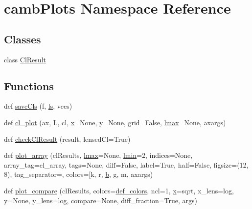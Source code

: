 \hypertarget{namespacecambPlots}{}\section{camb\+Plots Namespace Reference}
\label{namespacecambPlots}
\subsection*{Classes}
\begin{DoxyCompactItemize}
\item 
class \mbox{\hyperlink{classcambPlots_1_1ClResult}{Cl\+Result}}
\end{DoxyCompactItemize}
\subsection*{Functions}
\begin{DoxyCompactItemize}
\item 
def \mbox{\hyperlink{namespacecambPlots_ab98294b0b14bbdbda8be11a187411746}{save\+Cls}} (f, \mbox{\hyperlink{plotTT_8m_aac1113e50f7f1460beeaeeba69f63701}{ls}}, vecs)
\item 
def \mbox{\hyperlink{namespacecambPlots_acbf66894e403d2b8926fa5a598fb204d}{cl\+\_\+plot}} (ax, L, cl, \mbox{\hyperlink{plotTT_8m_a9336ebf25087d91c818ee6e9ec29f8c1}{x}}=None, y=None, grid=False, \mbox{\hyperlink{plotTT_8m_aa9755a1150619f3bbad65080cf613ef8}{lmax}}=None, axargs)
\item 
def \mbox{\hyperlink{namespacecambPlots_a92f653f492e72e931e693f9e0e0a4c6a}{check\+Cl\+Result}} (result, lensed\+Cl=True)
\item 
def \mbox{\hyperlink{namespacecambPlots_a0929c1777ebbcf7b4f020b63ec6ce36f}{plot\+\_\+array}} (cl\+Results, \mbox{\hyperlink{plotTT_8m_aa9755a1150619f3bbad65080cf613ef8}{lmax}}=None, \mbox{\hyperlink{plotTT_8m_aef6a8f6b3fd299f38d7aeaa7aff6bbf3}{lmin}}=2, indices=None, array\+\_\+tag=\textquotesingle{}cl\+\_\+array\textquotesingle{}, tags=None, diff=False, label=True, half=False, figsize=(12, 8), tag\+\_\+separator=\textquotesingle{}\textquotesingle{}, colors=\mbox{[}\textquotesingle{}k\textquotesingle{}, r, \mbox{\hyperlink{plotTT_8m_ac0431efac4d7c393d1e70b86115cb93f}{b}}, g, m, axargs)
\item 
def \mbox{\hyperlink{namespacecambPlots_a5ba7df009754321b923630f25d8f7ddc}{plot\+\_\+compare}} (cl\+Results, colors=\mbox{\hyperlink{namespacecambPlots_ac3e5045bfeb5c7c0e5dfc22c4eae07a8}{def\+\_\+colors}}, ncl=1, \mbox{\hyperlink{plotTT_8m_a9336ebf25087d91c818ee6e9ec29f8c1}{x}}=\textquotesingle{}sqrt\textquotesingle{}, x\+\_\+lens=\textquotesingle{}log\textquotesingle{}, y=None, y\+\_\+lens=\textquotesingle{}log\textquotesingle{}, compare=None, diff\+\_\+fraction=True, args)
\end{DoxyCompactItemize}
